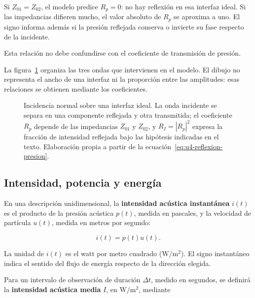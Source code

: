 Si \(Z_{01}=Z_{02}\), el modelo predice \(R_p=0\): no hay reflexión en esa
interfaz ideal. Si las impedancias difieren mucho, el valor absoluto de
\(R_p\) se aproxima a uno. El signo informa además si la presión reflejada
conserva o invierte su fase respecto de la incidente.

 Esta relación no debe confundirse con
el coeficiente de transmisión de presión.

La figura~\ref{fig:u4-impedancia-reflexion} organiza las tres ondas que
intervienen en el modelo. El dibujo no representa el ancho de una interfaz ni
la proporción entre las amplitudes: esas relaciones se obtienen mediante los
coeficientes.

\begin{figure}[htbp]
    \centering
    
    \caption{Incidencia normal sobre una interfaz ideal. La onda incidente se
    separa en una componente reflejada y otra transmitida; el coeficiente
    \(R_p\) depende de las impedancias \(Z_{01}\) y \(Z_{02}\), y
    \(R_I=|R_p|^2\) expresa la fracción de intensidad reflejada bajo las
    hipótesis indicadas en el texto. Elaboración propia a partir de la
    ecuación~\eqref{eq:u4-reflexion-presion}.}
    \label{fig:u4-impedancia-reflexion}
\end{figure}

\subsection{Intensidad, potencia y energía}
\label{sec:u4-intensidad-potencia}

En una descripción unidimensional, la \textbf{intensidad acústica instantánea}
\(i(t)\) es el producto de la presión acústica \(p(t)\), medida en pascales, y
la velocidad de partícula \(u(t)\), medida en metros por segundo:

\begin{equation}
    i(t)=p(t)u(t).
    \label{eq:u4-intensidad-instantanea}
\end{equation}

La unidad de \(i(t)\) es el watt por metro cuadrado
(\(\text{W}/\text{m}^2\)). El signo instantáneo indica el sentido del flujo de
energía respecto de la dirección elegida.

Para un intervalo de observación de duración \(\Delta t\), medido en segundos,
se definirá la \textbf{intensidad acústica media} \(I\), en
\(\text{W}/\text{m}^2\), mediante

